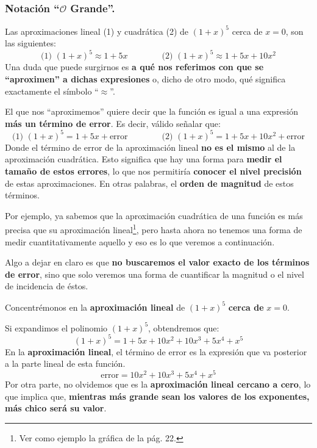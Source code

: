\documentclass[12pt]{article}
\begin{document}
\subsubsection{Notación ``$\mathcal{O}$ Grande''.}

Las aproximaciones lineal (1) y cuadrática (2) de $(1 + x)^{5}$ cerca de $x = 0$, son las siguientes:
\[
\text{(1) } (1 + x)^{5} \approx 1 + 5x
 \qquad \qquad 
\text{(2) } (1 + x)^{5} \approx 1 + 5x + 10x^{2}
\]
Una duda que puede surgirnos es \textbf{a qué nos referimos con que se ``aproximen'' a dichas expresiones} o, dicho de otro modo, qué significa exactamente el símbolo ``$\approx$''.

El que nos ``aproximemos'' quiere decir que la función es igual a una expresión \textbf{más un término de error}. Es decir, válido señalar que:
\[
\text{(1) } (1 + x)^{5} = 1 + 5x + \text{error}
 \qquad \qquad 
\text{(2) } (1 + x)^{5} = 1 + 5x + 10x^{2} + \text{error}
\]
Donde el término de error de la aproximación lineal \textbf{no es el mismo} al de la aproximación cuadrática. Esto significa que hay una forma para \textbf{medir el tamaño de estos errores}, lo que nos permitiría \textbf{conocer el nivel precisión} de estas aproximaciones. En otras palabras, el \textbf{orden de magnitud} de estos términos.

Por ejemplo, ya sabemos que la aproximación cuadrática de una función es más precisa que su aproximación lineal\footnote{Ver como ejemplo la gráfica de la pág. 22.}, pero hasta ahora no tenemos una forma de medir cuantitativamente aquello y eso es lo que veremos a continuación.

Algo a dejar en claro es que \textbf{no buscaremos el valor exacto de los términos de error}, sino que solo veremos una forma de cuantificar la magnitud o el nivel de incidencia de éstos.

Concentrémonos en la \textbf{aproximación lineal} de $(1 + x)^{5}$ \textbf{cerca de} $x = 0$.


Si expandimos el polinomio $(1 + x)^{5}$, obtendremos que:
\[(1 + x)^{5} = 1 + 5x + 10x^{2} + 10x^{3} + 5x^{4} + x^{5}\]
\newpage
En la \textbf{aproximación lineal}, el término de error es la expresión que va posterior a la parte lineal de esta función.
\[\text{error} = 10x^{2} + 10x^{3} + 5x^{4} + x^{5}\]
Por otra parte, no olvidemos que es la \textbf{aproximación lineal cercano a cero}, lo que implica que, \textbf{mientras más grande sean los valores de los exponentes, más chico será su valor}.
\end{document}
